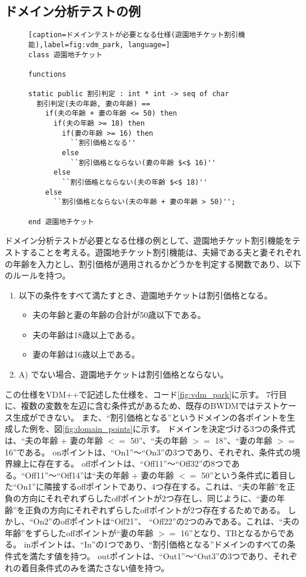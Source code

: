 \documentclass[uplatex, report, a4j, 10pt]{jsbook}
\begin{document}
\subsection{ドメイン分析テストの例}
\begin{figure}[tp]
  \begin{lstlisting}[caption=ドメインテストが必要となる仕様(遊園地チケット割引機能),label=fig:vdm_park, language=]
class 遊園地チケット

functions

static public 割引判定 : int * int -> seq of char
  割引判定(夫の年齢, 妻の年齢) ==
    if(夫の年齢 + 妻の年齢 <= 50) then
      if(夫の年齢 >= 18) then
        if(妻の年齢 >= 16) then
          ``割引価格となる''
        else
          ``割引価格とならない(妻の年齢 $<$ 16)''
      else
        ``割引価格とならない(夫の年齢 $<$ 18)''
    else
      ``割引価格とならない(夫の年齢 + 妻の年齢 > 50)'';

end 遊園地チケット
\end{lstlisting}
\end{figure}

ドメイン分析テストが必要となる仕様の例として、遊園地チケット割引機能をテストすることを考える。遊園地チケット割引機能は、夫婦である夫と妻それぞれの年齢を入力とし、割引価格が適用されるかどうかを判定する関数であり、以下のルールを持つ。
\begin{enumerate}
  \renewcommand{\labelenumi}{\Alph{enumi})}
  \item\label{enu:yuenchi} 以下の条件をすべて満たすとき、遊園地チケットは割引価格となる。
        \begin{itemize}
          \item 夫の年齢と妻の年齢の合計が50歳以下である。
          \item 夫の年齢は18歳以上である。
          \item 妻の年齢は16歳以上である。
        \end{itemize}
  \item A) でない場合、遊園地チケットは割引価格とならない。
\end{enumerate}
この仕様をVDM++で記述した仕様を、コード\ref{fig:vdm_park}に示す。
7行目に、複数の変数を左辺に含む条件式があるため、既存のBWDMではテストケース生成ができない。
また、``割引価格となる''というドメインの各ポイントを生成した例を、図\ref{fig:domain_points}に示す。
ドメインを決定づける3つの条件式は、``夫の年齢 + 妻の年齢 $<=$ 50''、``夫の年齢 $>=$ 18''、``妻の年齢 $>=$ 16''である。
onポイントは、``On1''〜``On3''の3つであり、それぞれ、条件式の境界線上に存在する。
offポイントは、``Off11''〜``Off32''の8つである。``Off11''〜``Off14''は``夫の年齢 + 妻の年齢 $<=$ 50''という条件式に着目した``On1''に隣接するoffポイントであり、4つ存在する。これは、``夫の年齢''を正負の方向にそれぞれずらしたoffポイントが2つ存在し、同じように、``妻の年齢''を正負の方向にそれぞれずらしたoffポイントが2つ存在するためである。
しかし、``On2''のoffポイントは``Off21''、 ``Off22''の2つのみである。これは、``夫の年齢''をずらしたoffポイントが``妻の年齢 $>=$ 16''となり、TBとなるからである。
inポイントは、``In''の1つであり、``割引価格となる''ドメインのすべての条件式を満たす値を持つ。
outポイントは、``Out1''〜``Out3''の3つであり、それぞれの着目条件式のみを満たさない値を持つ。
\end{document}
